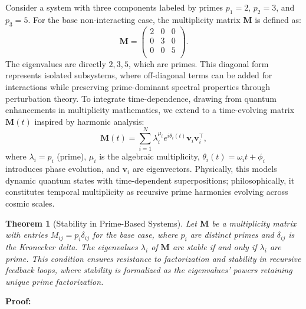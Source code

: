 \documentclass{article}
\theoremstyle{plain}
\newtheorem{theorem}{Theorem}
\begin{document}
Consider a system with three components labeled by primes $p_1 = 2$, $p_2 = 3$, and $p_3 = 5$. For the base non-interacting case, the multiplicity matrix $\mathbf{M}$ is defined as:
\begin{equation}
\mathbf{M} = 
\begin{pmatrix}
2 & 0 & 0 \\
0 & 3 & 0 \\
0 & 0 & 5 \\
\end{pmatrix}.
\end{equation}
The eigenvalues are directly $2, 3, 5$, which are primes. This diagonal form represents isolated subsystems, where off-diagonal terms can be added for interactions while preserving prime-dominant spectral properties through perturbation theory.
To integrate time-dependence, drawing from quantum enhancements in multiplicity mathematics, we extend to a time-evolving matrix $\mathbf{M}(t)$ inspired by harmonic analysis:
\begin{equation}
\mathbf{M}(t) = \sum_{i=1}^N \lambda_i^{\mu_i} e^{i \theta_i(t)} \mathbf{v}_i \mathbf{v}_i^\top,
\end{equation}
where $\lambda_i = p_i$ (prime), $\mu_i$ is the algebraic multiplicity, $\theta_i(t) = \omega_i t + \phi_i$ introduces phase evolution, and $\mathbf{v}_i$ are eigenvectors. Physically, this models dynamic quantum states with time-dependent superpositions; philosophically, it constitutes temporal multiplicity as recursive prime harmonies evolving across cosmic scales.
\begin{theorem}[Stability in Prime-Based Systems]
Let $\mathbf{M}$ be a multiplicity matrix with entries $M_{ij} = p_i \delta_{ij}$ for the base case, where $p_i$ are distinct primes and $\delta_{ij}$ is the Kronecker delta. The eigenvalues $\lambda_i$ of $\mathbf{M}$ are stable if and only if $\lambda_i$ are prime. This condition ensures resistance to factorization and stability in recursive feedback loops, where stability is formalized as the eigenvalues' powers retaining unique prime factorization.
\end{theorem}
\textbf{Proof:}
\end{document}
